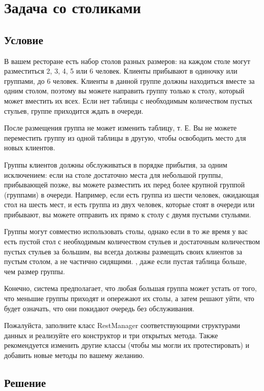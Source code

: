 \linenumbers
{}
\nolinenumbers	

\section{Задача со столиками}

\subsection{Условие}

В вашем ресторане есть набор столов разных размеров: на каждом столе могут разместиться 2, 3, 4, 5 или 6 человек. Клиенты прибывают в одиночку или группами, до 6 человек. Клиенты в данной группе должны находиться вместе за одним столом, поэтому вы можете направить группу только к столу, который может вместить их всех. Если нет таблицы с необходимым количеством пустых стульев, группе приходится ждать в очереди.

После размещения группа не может изменить таблицу, т. Е. Вы не можете переместить группу из одной таблицы в другую, чтобы освободить место для новых клиентов.

Группы клиентов должны обслуживаться в порядке прибытия, за одним исключением: если на столе достаточно места для небольшой группы, прибывающей позже, вы можете разместить их перед более крупной группой (группами) в очереди. Например, если есть группа из шести человек, ожидающая стол на шесть мест, и есть группа из двух человек, которые стоят в очереди или прибывают, вы можете отправить их прямо к столу с двумя пустыми стульями.

Группы могут совместно использовать столы, однако если в то же время у вас есть пустой стол с необходимым количеством стульев и достаточным количеством пустых стульев за большим, вы всегда должны размещать своих клиентов за пустым столом, а не частично сидящими. , даже если пустая таблица больше, чем размер группы.

Конечно, система предполагает, что любая большая группа может устать от того, что меньшие группы приходят и опережают их столы, а затем решают уйти, что будет означать, что они покидают очередь без обслуживания.

Пожалуйста, заполните класс RestManager соответствующими структурами данных и реализуйте его конструктор и три открытых метода. Также рекомендуется изменить другие классы (чтобы мы могли их протестировать) и добавить новые методы по вашему желанию.

\subsection{Решение}




